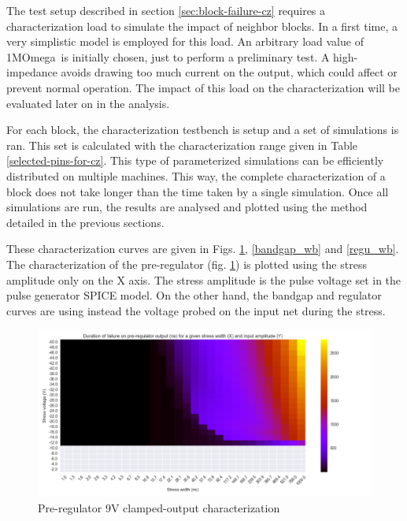 The test setup described in section \ref{sec:block-failure-cz} requires a characterization load to simulate the impact of neighbor blocks.
In a first time, a very simplistic model is employed for this load.
An arbitrary load value of 1M\textgreek{Omega}\ is initially chosen, just to perform a preliminary test.
A high-impedance avoids drawing too much current on the output, which could affect or prevent normal operation.
The impact of this load on the characterization will be evaluated later on in the analysis.

For each block, the characterization testbench is setup and a set of simulations is ran.
This set is calculated with the characterization range given in Table \ref{selected-pins-for-cz}.
This type of parameterized simulations can be efficiently distributed on multiple machines.
This way, the complete characterization of a block does not take longer than the time taken by a single simulation.
Once all simulations are run, the results are analysed and plotted using the method detailed in the previous sections.

These characterization curves are given in Figs. \ref{pre_regu_wb}, \ref{bandgap_wb} and \ref{regu_wb}.
The characterization of the pre-regulator (fig. \ref{pre_regu_wb}) is plotted using the stress amplitude only on the X axis.
The stress amplitude is the pulse voltage set in the pulse generator SPICE model.
On the other hand, the bandgap and regulator curves are using instead the voltage probed on the input net during the stress.


\begin{figure}[!h]
  \centering
  \includegraphics[width=\textwidth]{src/4/figures/preregulator_cz.png}
  \caption{Pre-regulator 9V clamped-output characterization}
  \label{pre_regu_wb}
\end{figure}

